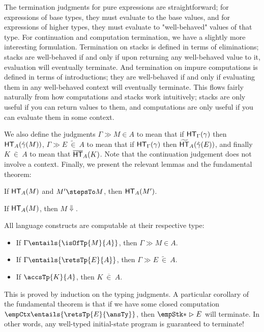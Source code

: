 \documentclass[letterpaper]{article}
\newcommand{\exref}[3]{#1 \gg #2\in #3}
\newcommand{\exrefe}[3]{#1 \gg #2\ \tilde{\in}\ #3}
\newcommand{\exrefk}[2]{#1\ \overline{\in}\ #2}
\begin{document}
The termination judgments for pure expressions are straightforward; for expressions of base types, they must evaluate to the base values, and for expressions of higher types, they must evaluate to "well-behaved" values of that type.
For continuation and computation termination, we have a slightly more interesting formulation.
Termination on stacks is defined in terms of eliminations; stacks are well-behaved if and only if upon returning any well-behaved value to it, evaluation will eventually terminate.
And termination on impure computations is defined in terms of introductions; they are well-behaved if and only if evaluating them in any well-behaved context will eventually terminate.
This flows fairly naturally from how computations and stacks work intuitively; stacks are only useful if you can return values to them, and computations are only useful if you can evaluate them in some context.

We also define the judgments $\exref{\Gamma}{M}{A}$ to mean that if $\HT[\Gamma](\gamma)$ then $\HT[A](\hat{\gamma}(M))$, $\exrefe{\Gamma}{E}{A}$ to mean that if $\HT[\Gamma](\gamma)$ then $\HTe[A](\hat{\gamma}(E))$, and finally $\exrefk{K}{A}$ to mean that $\HTk[A](K)$.
Note that the continuation judgement does not involve a context.
Finally, we present the relevant lemmas and the fundamental theorem:

\begin{lemma}
  If $\HT[A](M)$ and $M' \stepsTo M$, then $\HT[A](M')$.
\end{lemma}

\begin{lemma}
  If $\HT[A](M)$, then $M \Downarrow$.
\end{lemma}

\begin{theorem}
  All language constructs are computable at their respective type:
  \begin{itemize}
    \item If $\Gamma \entails{\isOfTp{M}{A}}$, then $\exref{\Gamma}{M}{A}$.
    \item If $\Gamma \entails{\retsTp{E}{A}}$, then $\exrefe{\Gamma}{E}{A}$.
    \item If $\accsTp{K}{A}$, then $\exrefk{K}{A}$.
  \end{itemize}
\end{theorem}

This is proved by induction on the typing judgments.
A particular corollary of the fundamental theorem is that if we have some closed computation $\empCtx \entails{\retsTp{E}{\ansTy}}$, then $\empStk* \vartriangleright E$ will terminate.
In other words, any well-typed initial-state program is guaranteed to terminate!
\end{document}
